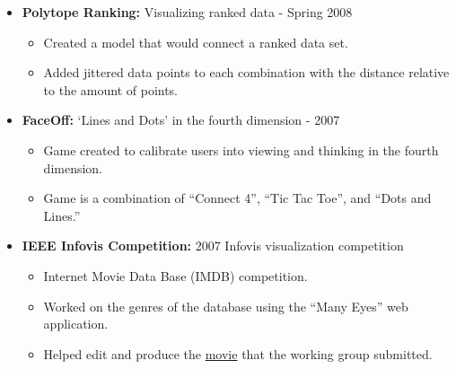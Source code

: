 \documentclass[oneside]{article}
\begin{document}
\begin{itemize}
\item{\bf Polytope Ranking:} Visualizing ranked data - Spring 2008
\begin{itemize}
  \item Created a model that would connect a ranked data set.
  \item Added jittered data points to each combination with the distance relative to the amount of points.
\end{itemize}


\item{\bf FaceOff:} `Lines and Dots' in the fourth dimension - 2007
\begin{itemize}
  \item Game created to calibrate users into viewing and thinking in the fourth dimension.
  \item Game is a combination of  ``Connect 4'', ``Tic Tac Toe'', and ``Dots and Lines.''
\end{itemize}

%



\item{\bf IEEE Infovis Competition:} 2007 Infovis visualization competition
\begin{itemize}
  \item Internet Movie Data Base (IMDB) competition.
  \item Worked on the genres of the database using the ``Many Eyes'' web application.
  \item Helped edit and produce the \href{http://had.co.nz/infovis-2007/}{movie} that the working group submitted.
\end{itemize}


\end{itemize}
\end{document}
